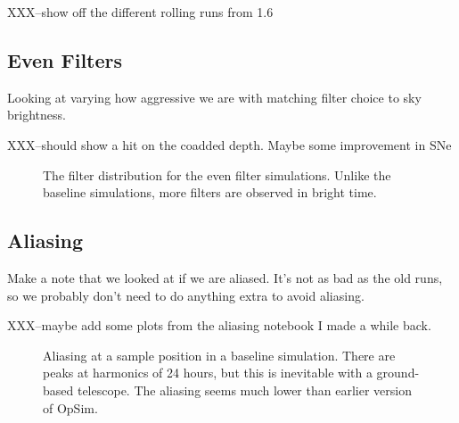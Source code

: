 XXX--show off the different rolling runs from 1.6

\subsection{Even Filters}

Looking at varying how aggressive we are with matching filter choice to sky brightness.  

XXX--should show a hit on the coadded depth. Maybe some improvement in SNe

\begin{figure}
\caption{The filter distribution for the even filter simulations. Unlike the baseline simulations, more filters are observed in bright time.}\label{fig:even_filt_hourglass}
\end{figure}

\subsection{Aliasing}

Make a note that we looked at if we are aliased. It's not as bad as the old runs, so we probably don't need to do anything extra to avoid aliasing.

XXX--maybe add some plots from the aliasing notebook I made a while back.

\begin{figure}
\caption{Aliasing at a sample position in a baseline simulation. There are peaks at harmonics of 24 hours, but this is inevitable with a ground-based telescope. The aliasing seems much lower than earlier version of OpSim.}
\end{figure}